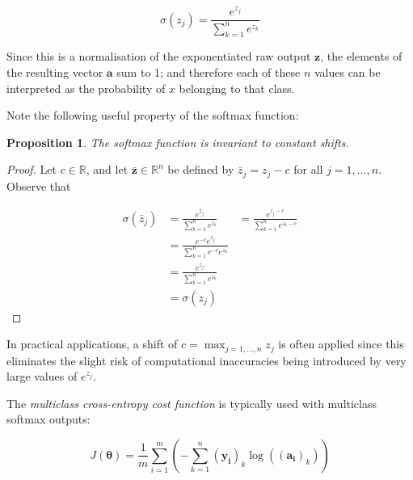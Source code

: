 \documentclass{article}[11pt]
\newtheorem{proposition}{Proposition}
\begin{document}
        $$
        \sigma(z_j) = \frac{e^{z_j}}{\sum_{k=1}^{n} e^{z_k}}
        $$
        
        Since this is a normalisation of the exponentiated raw output $\mathbf{z}$, the elements of the resulting vector $\mathbf{a}$ sum to 1; and therefore each of these $n$ values can be interpreted as the probability of $x$ belonging to that class.
        
        Note the following useful property of the softmax function: 
        
        \begin{proposition}
            
            The softmax function is invariant to constant shifts.
            
        \end{proposition}
    
        \begin{proof}
            
            Let $c \in \mathbb{R}$, and let $\mathbf{\bar{z}} \in \mathbb{R}^n$ be defined by $\bar{z}_j = z_j - c$ for all $j = 1, \ldots, n$. Observe that
            
            $$ \begin{aligned}
                \sigma(\bar{z}_j)
                &= \frac{e^{\bar{z}_j}}{\sum_{k=1}^{n} e^{\bar{z}_k}}
                &= \frac{e^{z_j - c}}{\sum_{k=1}^{n} e^{z_k - c}} \\
                &= \frac{e^{-c} e^{z_j}}{\sum_{k=1}^{n} e^{-c} e^{z_k}} \\
                &= \frac{e^{z_j}}{\sum_{k=1}^{n} e^{z_k}} \\
                &= \sigma(z_j)
            \end{aligned} $$
            
        \end{proof}
        
        In practical applications, a shift of $c = \max_{j = 1, \ldots, n} z_j$ is often applied since this eliminates the slight risk of computational inaccuracies being introduced by very large values of $e^{z_j}$.
        
        The \textit{multiclass cross-entropy cost function} is typically used with multiclass softmax outputs:
        
        $$
        J(\boldsymbol{\theta}) = \frac{1}{m} \sum_{i=1}^{m} \left( - \sum_{k=1}^{n} (\mathbf{y_i})_k \log(\mathbf{(a_i)}_k) \right)
        $$
        
\end{document}

